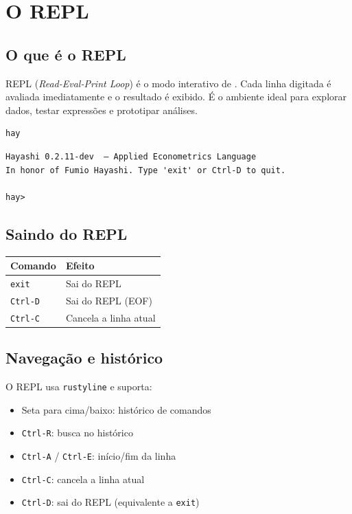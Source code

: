 \chapter{O REPL}

\section{O que é o REPL}

REPL (\textit{Read-Eval-Print Loop}) é o modo interativo de \hayashi{}. Cada linha
digitada é avaliada imediatamente e o resultado é exibido. É o ambiente ideal para
explorar dados, testar expressões e prototipar análises.

\begin{lstlisting}[style=inline, language=sh]
hay
\end{lstlisting}

\begin{lstlisting}[style=inline]
Hayashi 0.2.11-dev  — Applied Econometrics Language
In honor of Fumio Hayashi. Type 'exit' or Ctrl-D to quit.

hay>
\end{lstlisting}

\section{Saindo do REPL}

\begin{center}
\begin{tabular}{ll}
\toprule
\textbf{Comando} & \textbf{Efeito} \\
\midrule
\texttt{exit}   & Sai do REPL \\
\texttt{Ctrl-D} & Sai do REPL (EOF) \\
\texttt{Ctrl-C}                & Cancela a linha atual \\
\bottomrule
\end{tabular}
\end{center}

\section{Navegação e histórico}

O REPL usa \texttt{rustyline} e suporta:

\begin{itemize}
  \item Seta para cima/baixo: histórico de comandos
  \item \texttt{Ctrl-R}: busca no histórico
  \item \texttt{Ctrl-A} / \texttt{Ctrl-E}: início/fim da linha
  \item \texttt{Ctrl-C}: cancela a linha atual
  \item \texttt{Ctrl-D}: sai do REPL (equivalente a \texttt{exit})
\end{itemize}

